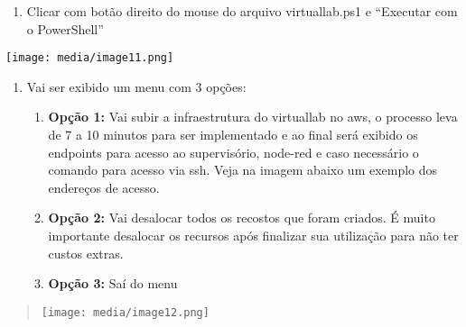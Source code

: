 \begin{enumerate}
\def\labelenumi{\arabic{enumi}.}
\setcounter{enumi}{5}
\item
  Clicar com botão direito do mouse do arquivo virtuallab.ps1 e
  ``Executar com o PowerShell''
\end{enumerate}

\texttt{[image: media/image11.png]}

\begin{enumerate}
\def\labelenumi{\arabic{enumi}.}
\setcounter{enumi}{6}
\item
  Vai ser exibido um menu com 3 opções:

  \begin{enumerate}
  \def\labelenumii{\arabic{enumii}.}
  \item
    \textbf{Opção 1:} Vai subir a infraestrutura do virtuallab no aws, o
    processo leva de 7 a 10 minutos para ser implementado e ao final
    será exibido os endpoints para acesso ao supervisório, node-red e
    caso necessário o comando para acesso via ssh. Veja na imagem abaixo
    um exemplo dos endereços de acesso.
  \item
    \textbf{Opção 2:} Vai desalocar todos os recostos que foram criados.
    É muito importante desalocar os recursos após finalizar sua
    utilização para não ter custos extras.
  \item
    \textbf{Opção 3:} Saí do menu
  \end{enumerate}
\end{enumerate}

\begin{quote}
\texttt{[image: media/image12.png]}
\end{quote}
